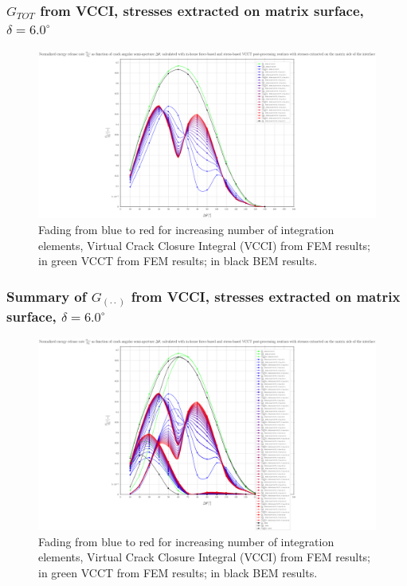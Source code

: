 \begin{frame}
\frametitle{\small $G_{TOT}$ from VCCI, stresses extracted on matrix surface, $\delta=6.0^{\circ}$}
\vspace{-0.5cm}
\centering
\captionsetup[figure]{font=scriptsize,labelfont=scriptsize}
\begin{figure}[!h]
\centering
\includegraphics[height=0.7\textheight]{2017-07-25_AbqRunSummary_SmallStrain_D06/pdf/2017-07-25_AbqRunSummary_SmallStrain_D06_F-SoM-VCCT_GTOT.pdf}
  \caption{\scriptsize Fading from blue to red for increasing number of integration elements, Virtual Crack Closure Integral (VCCI) from FEM results; in green VCCT from FEM results; in black BEM results.}
  \label{fig:res1}
\end{figure}
\end{frame}
\begin{frame}
\frametitle{\small Summary of $G_{\left(\cdot\cdot\right)}$ from VCCI, stresses extracted on matrix surface, $\delta=6.0^{\circ}$}
\vspace{-0.5cm}
\centering
\captionsetup[figure]{font=scriptsize,labelfont=scriptsize}
\begin{figure}[!h]
\centering
\includegraphics[height=0.7\textheight]{2017-07-25_AbqRunSummary_SmallStrain_D06/pdf/2017-07-25_AbqRunSummary_SmallStrain_D06_F-SoM-VCCT_Summary.pdf}
  \caption{\scriptsize Fading from blue to red for increasing number of integration elements, Virtual Crack Closure Integral (VCCI) from FEM results; in green VCCT from FEM results; in black BEM results.}
  \label{fig:res1}
\end{figure}
\end{frame}
